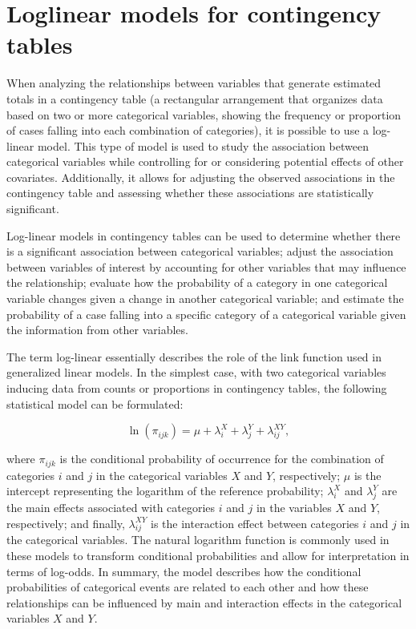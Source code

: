 \documentclass[
  12pt,
]{book}
\begin{document}
\hypertarget{loglinear-models-for-contingency-tables}{%
\section{Loglinear models for contingency tables}\label{loglinear-models-for-contingency-tables}}

When analyzing the relationships between variables that generate estimated totals in a contingency table (a rectangular arrangement that organizes data based on two or more categorical variables, showing the frequency or proportion of cases falling into each combination of categories), it is possible to use a log-linear model. This type of model is used to study the association between categorical variables while controlling for or considering potential effects of other covariates. Additionally, it allows for adjusting the observed associations in the contingency table and assessing whether these associations are statistically significant.

Log-linear models in contingency tables can be used to determine whether there is a significant association between categorical variables; adjust the association between variables of interest by accounting for other variables that may influence the relationship; evaluate how the probability of a category in one categorical variable changes given a change in another categorical variable; and estimate the probability of a case falling into a specific category of a categorical variable given the information from other variables.

The term log-linear essentially describes the role of the link function used in generalized linear models. In the simplest case, with two categorical variables inducing data from counts or proportions in contingency tables, the following statistical model can be formulated:

\[
\ln(\pi_{ijk}) = \mu + \lambda_i^X + \lambda_j^Y + \lambda_{ij}^{XY},   
\]

where \(\pi_{ijk}\) is the conditional probability of occurrence for the combination of categories \(i\) and \(j\) in the categorical variables \(X\) and \(Y\), respectively; \(\mu\) is the intercept representing the logarithm of the reference probability; \(\lambda_i^X\) and \(\lambda_j^Y\) are the main effects associated with categories \(i\) and \(j\) in the variables \(X\) and \(Y\), respectively; and finally, \(\lambda_{ij}^{XY}\) is the interaction effect between categories \(i\) and \(j\) in the categorical variables. The natural logarithm function is commonly used in these models to transform conditional probabilities and allow for interpretation in terms of log-odds. In summary, the model describes how the conditional probabilities of categorical events are related to each other and how these relationships can be influenced by main and interaction effects in the categorical variables \(X\) and \(Y\).
\end{document}
